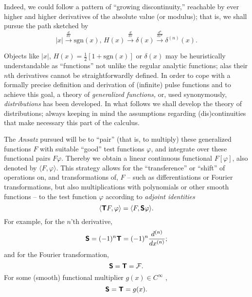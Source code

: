 
Indeed, we could follow a pattern of ``growing discontinuity,''
reachable by ever higher and higher derivatives of the
absolute value (or modulus); that is, we shall pursue the path sketched by
$$
\vert x\vert
\stackrel{\frac{d}{dx}  }{  \longrightarrow}
\textrm{sgn}(x) ,\,
H(x)
\stackrel{\frac{d}{dx} }{ \longrightarrow}
\delta (x)
\stackrel{\frac{d^n}{dx^n} }{ \longrightarrow}
\delta^{(n)} (x)
.
$$



Objects like $\vert x\vert$,  $H(x)=\frac{1}{2}\left[ 1+\textrm{sgn}(x)\right]$ or $\delta (x)$ may be heuristically understandable
as ``functions'' not unlike
the regular analytic functions; alas
their $n$th derivatives cannot be straightforwardly defined.
In order to cope with a formally precise definition
and derivation of (infinite) pulse functions and to achieve this goal,
a theory of  {\em  generalized functions,}
or, used synonymously,
{\em distributions}
has been developed.
In what follows we shall
develop the theory of distributions;
always keeping in mind the assumptions
regarding (dis)continuities
that make necessary this part of the calculus.

The {\it Ansatz} pursued
\cite{richards_youn_1990}
will be to ``pair'' (that is, to multiply) these generalized functions $F$ with suitable ``good''
test functions $\varphi$,
and integrate over these functional pairs $F \varphi$.
Thereby we obtain a linear continuous functional
$F[\varphi]$,
also denoted by
$\langle F, \varphi \rangle $.
This strategy allows for the
``transference'' or ``shift'' of operations on, and transformations of, $F$
-- such as differentiations or Fourier transformations, but also multiplications with polynomials or other smooth functions --
to the test function $\varphi$ according to
{\em adjoint identities}
\begin{equation}
\langle \textsf{\textbf{T}} F, \varphi \rangle
=
\langle F, \textsf{\textbf{S}} \varphi \rangle.
\end{equation}
For example,
for the $n$'th derivative,
\begin{equation}
\textsf{\textbf{S}} = (-1)^n \textsf{\textbf{T}} = (-1)^n \frac{d^{(n)}}{dx^{(n)}};
\end{equation}
and for the Fourier transformation,
\begin{equation}
\textsf{\textbf{S}} =   \textsf{\textbf{T}} = {\cal F} .
\end{equation}
For some (smooth) functional multiplier $g(x)\in C^\infty$ ,
\begin{equation}
\textsf{\textbf{S}} =   \textsf{\textbf{T}} = g(x) .
\label{2013-m-ch-di-multipl}
\end{equation}



